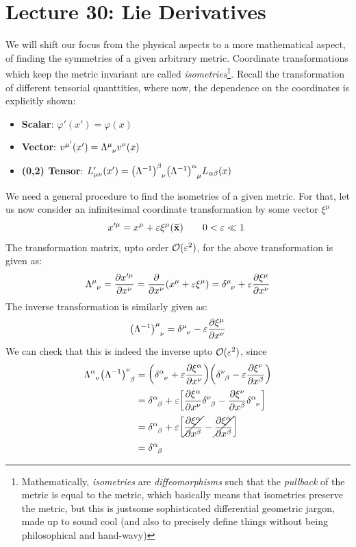 \section*{Lecture 30: Lie Derivatives}
We will shift our focus from the physical aspects to a more mathematical aspect, of finding the symmetries of a given arbitrary metric. Coordinate transformations which keep the metric invariant are called \textit{isometries}\footnote{Mathematically,  \textit{isometries} are \textit{diffeomorphisms} such that the \textit{pullback} of the metric is equal to the metric, which basically means that isometries preserve the metric, but this is justsome sophisticated differential geometric jargon, made up to sound cool (and also to precisely define things without being philosophical and hand-wavy)}. Recall the transformation of different tensorial quanttities, where now, the dependence on the coordinates is explicitly shown:
\begin{itemize}[label=$\blacktriangleright$]
    \item \textbf{Scalar}: $\varphi'(x') = \varphi(x) $
    \item \textbf{Vector}: $v^{\mu '}(x') = \trmat{\mu}{\nu} v^{\nu}(x)$
    \item \textbf{(0,2) Tensor}: $L_{\mu\nu}'(x') = \itrmat{\beta}{\nu}\itrmat{\alpha}{\mu}L_{\alpha\beta}(x)$
\end{itemize}
We need a general procedure to find the isometries of a given metric. For that, let us now consider an infinitesimal coordinate transformation by some vector $\xi^\mu$
$$x'^\mu = x^\mu + \varepsilon \xi^\mu(\vb{\bar{x}})\qquad 0<\varepsilon\ll 1\ $$
The transformation matrix, upto order $\mathcal O(\varepsilon^2)$, for the above transformation is given as:
\begin{align*}
    \trmat{\mu}{\nu} = \pdv{x'^\mu}{x^\nu} = \pdv{x^\nu}\qty(x^\mu + \varepsilon \xi^\mu) = \tensor{\delta}{^\mu _\nu}+\varepsilon\pdv{\xi^\mu}{x^\nu}
\end{align*}
The inverse transformation is similarly given as:
$$ \itrmat{\mu}{\nu} =\tensor{\delta}{^\mu _\nu}-\varepsilon\pdv{\xi^\mu}{x^\nu}$$
We can check that this is indeed the inverse upto $\mathcal O(\varepsilon^2)$, since 
\begin{align*}
    \trmat{\alpha}{\nu}\itrmat{\nu}{\beta} &= \qty( \tensor{\delta}{^\alpha _\nu}+\varepsilon\pdv{\xi^\alpha}{x^\nu})\qty(\tensor{\delta}{^\nu _\beta}-\varepsilon\pdv{\xi^\nu}{x^\beta})\\
    &=\tensor{\delta}{^\alpha _\beta} + \varepsilon\qty[\pdv{\xi^\alpha}{x^\nu} \tensor{\delta}{^\nu _\beta}-\pdv{\xi^\nu}{x^\beta} \tensor{\delta}{^\alpha _\nu}]\\
    &=\tensor{\delta}{^\alpha _\beta} + \varepsilon\qty[\cancel{\pdv{\xi^\alpha}{x^\beta}}-\cancel{\pdv{\xi^\alpha}{x^\beta}} ]\\
    &=\tensor{\delta}{^\alpha _\beta}
\end{align*}
